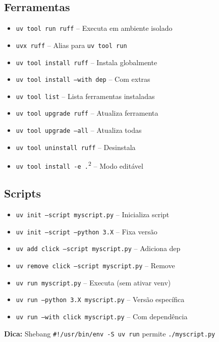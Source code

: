 \documentclass[a4paper,9pt]{article}
\begin{document}
\begin{multicols}{2}
\subsection*{Ferramentas}
\begin{itemize}[leftmargin=0.3cm]
    \item \texttt{uv tool run ruff} -- Executa em ambiente isolado
    \item \texttt{uvx ruff} -- Alias para \texttt{uv tool run}
    \item \texttt{uv tool install ruff} -- Instala globalmente
    \item \texttt{uv tool install --with dep} -- Com extras
    \item \texttt{uv tool list} -- Lista ferramentas instaladas
    \item \texttt{uv tool upgrade ruff} -- Atualiza ferramenta
    \item \texttt{uv tool upgrade --all} -- Atualiza todas
    \item \texttt{uv tool uninstall ruff} -- Desinstala
    \item \texttt{uv tool install -e .}\textsuperscript{2} -- Modo editável
\end{itemize}

\subsection*{Scripts}
\begin{itemize}[leftmargin=0.3cm]
    \item \texttt{uv init --script myscript.py} -- Inicializa script
    \item \texttt{uv init --script --python 3.X} -- Fixa versão
    \item \texttt{uv add click --script myscript.py} -- Adiciona dep
    \item \texttt{uv remove click --script myscript.py} -- Remove
    \item \texttt{uv run myscript.py} -- Executa (sem ativar venv)
    \item \texttt{uv run --python 3.X myscript.py} -- Versão específica
    \item \texttt{uv run --with click myscript.py} -- Com dependência
\end{itemize}

{\footnotesize \textbf{Dica:} Shebang \texttt{\#!/usr/bin/env -S uv run} permite \texttt{./myscript.py}}


\end{multicols}
\end{document}
